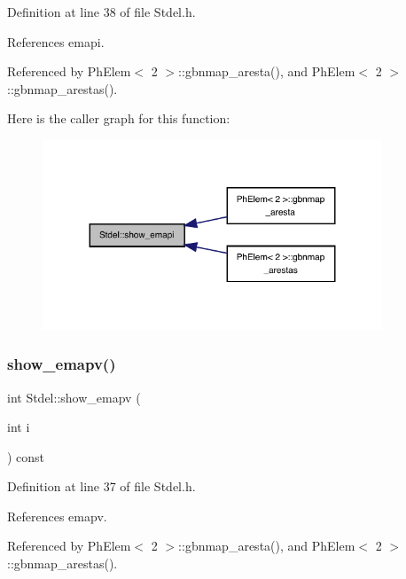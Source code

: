 Definition at line 38 of file Stdel.\+h.



References emapi.



Referenced by Ph\+Elem$<$ 2 $>$\+::gbnmap\+\_\+aresta(), and Ph\+Elem$<$ 2 $>$\+::gbnmap\+\_\+arestas().

Here is the caller graph for this function\+:
\nopagebreak
\begin{figure}[H]
\begin{center}
\leavevmode
\includegraphics[width=287pt]{classStdel_aca7fb885191a952c013e930521a42213_icgraph}
\end{center}
\end{figure}
\mbox{\label{classStdel_ad474ffc52b051ae8317b3fdb583c4c98}} 
\subsubsection{\texorpdfstring{show\+\_\+emapv()}{show\_emapv()}}
{\footnotesize\ttfamily int Stdel\+::show\+\_\+emapv (\begin{DoxyParamCaption}\item[{int}]{i }\end{DoxyParamCaption}) const\hspace{0.3cm}{\ttfamily [inline]}}



Definition at line 37 of file Stdel.\+h.



References emapv.



Referenced by Ph\+Elem$<$ 2 $>$\+::gbnmap\+\_\+aresta(), and Ph\+Elem$<$ 2 $>$\+::gbnmap\+\_\+arestas().

